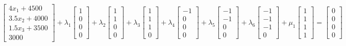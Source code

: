 \documentclass[a4paper, 12pt]{report}
\begin{document}
\begin{adjustwidth}{-25pt}{0pt}
$$ \begin{bmatrix}4x_1 + 4500\\3.5x_2 + 4000\\1.5x_3 + 3500\\3000\end{bmatrix} + \lambda_1 \begin{bmatrix}1\\0\\0\\0\end{bmatrix} + \lambda_2 \begin{bmatrix}1\\1\\0\\0\end{bmatrix} + \lambda_3 \begin{bmatrix} 1\\1\\1\\0 \end{bmatrix} + \lambda_4 \begin{bmatrix}-1\\0\\0\\0\end{bmatrix} + \lambda_5 \begin{bmatrix} -1\\-1\\0\\0 \end{bmatrix} + \lambda_6 \begin{bmatrix}-1\\-1\\-1\\0\end{bmatrix} + \mu_1 \begin{bmatrix}1\\1\\1\\1\end{bmatrix} = \begin{bmatrix}0\\0\\0\\0\end{bmatrix} $$
\end{adjustwidth}
\end{document}

